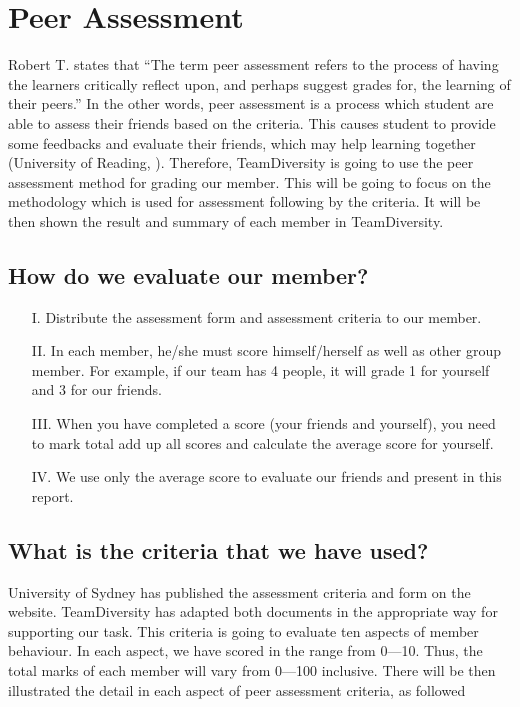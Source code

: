 \documentclass[11pt]{article}
\begin{document}
\newpage	
\section{Peer Assessment}

Robert T. \cite{roberts2006self} states that “The term peer assessment refers to the process of having the learners critically reflect upon, and perhaps suggest grades for, the learning of their peers.” In the other words, peer assessment is a process which student are able to assess their friends based on the criteria. This causes student to provide some feedbacks and evaluate their friends, which may help learning together (University of Reading, \cite{peerAssessment}). Therefore, TeamDiversity is going to use the peer assessment method for grading our member. This will be going to focus on the methodology which is used for assessment following by the criteria. It will be then shown the result and summary of each member in TeamDiversity. 

\subsection{How do we evaluate our member?}	
\begin{itemize}
\item[I.] Distribute the assessment form and assessment criteria to our member.
\item[II.] In each member, he/she must score himself/herself as well as other group member. For example, if our team has 4 people, it will grade 1 for yourself and 3 for our friends.
\item[III.] When you have completed a score (your friends and yourself), you need to mark total add up all scores and calculate the average score for yourself.
\item[IV.] We use only the average score to evaluate our friends and present in this report. 
\end{itemize}

\subsection{What is the criteria that we have used?}
University of Sydney \cite{AssessmentCiteria} has published the assessment criteria and form on the website. TeamDiversity has adapted both documents in the appropriate way for supporting our task. This criteria is going to evaluate ten aspects of member behaviour. In each aspect, we have scored in the range from 0—10. Thus, the total marks of each member will vary from 0—100 inclusive. There will be then illustrated the detail in each aspect of peer assessment criteria, as followed \newline
\end{document}
